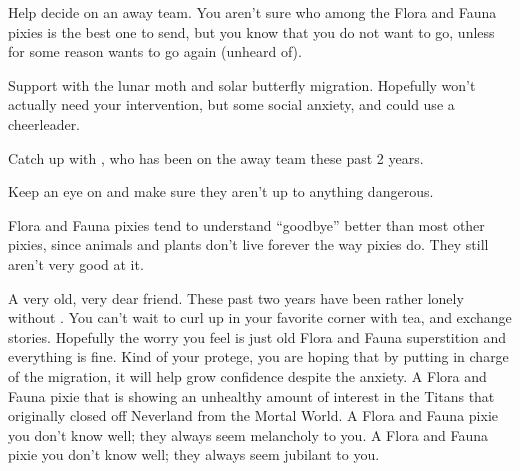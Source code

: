 \documentclass[char]{PP}
\begin{document}
\begin{itemz}
	\item Help \cSHead{} decide on an away team. You aren’t sure who among the Flora and Fauna pixies is the best one to send, but you know that you do not want to go, unless for some reason \cSPM{} wants to go again (unheard of).
	\item Support \cFButterfly{} with the lunar moth and solar butterfly migration. Hopefully \cFButterfly{\they} won’t actually need your intervention, but \cFButterfly{\they} \cFButterfly{\have} some social anxiety, and could use a cheerleader.
	\item Catch up with \cSPM{}, who has been on the away team these past 2 years.
	\item Keep an eye on \cFTitan{} and make sure they aren’t up to anything dangerous.
\end{itemz}

\begin{itemz}[Notes]
	\item Flora and Fauna pixies tend to understand ``goodbye'' better than most other pixies, since animals and plants don’t live forever the way pixies do. They still aren't very good at it.
\end{itemz}

\begin{contacts}
	\contact{\cSPM{}} A very old, very dear friend. These past two years have been rather lonely without \cSPM{\them}. You can’t wait to curl up in your favorite corner with tea, and exchange stories. Hopefully the worry you feel is just old Flora and Fauna superstition and everything is fine.
	\contact{\cFButterfly{}} Kind of your protege, you are hoping that by putting \cFButterfly{\them} in charge of the migration, it will help grow \cFButterfly{\their} confidence despite the anxiety.
	\contact{\cFTitan{}}  A Flora and Fauna pixie that is showing an unhealthy amount of interest in the Titans that originally closed off Neverland from the Mortal World.
	\contact{\cFWanabe{}} A Flora and Fauna pixie you don’t know well; they always seem melancholy to you.
	\contact{\cFHeart{}} A Flora and Fauna pixie you don’t know well; they always seem jubilant to you.
\end{contacts}
\end{document}
